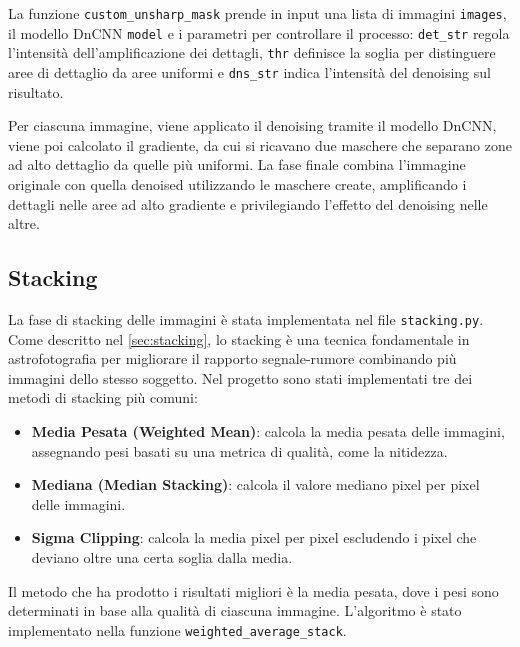La funzione \texttt{custom\_unsharp\_mask} prende in input una lista di immagini \texttt{images}, il modello DnCNN \texttt{model} e i parametri per controllare il processo: \texttt{det\_str} regola l'intensità dell'amplificazione dei dettagli, \texttt{thr} definisce la soglia per distinguere aree di dettaglio da aree uniformi e \texttt{dns\_str} indica l'intensità del denoising sul risultato. 

Per ciascuna immagine, viene applicato il denoising tramite il modello DnCNN, viene poi calcolato il gradiente, da cui si ricavano due maschere che separano zone ad alto dettaglio da quelle più uniformi. La fase finale combina l'immagine originale con quella denoised utilizzando le maschere create, amplificando i dettagli nelle aree ad alto gradiente e privilegiando l'effetto del denoising nelle altre.

\subsection{Stacking} \label{subsec:stacking_impl}

La fase di stacking delle immagini è stata implementata nel file \texttt{stacking.py}. Come descritto nel \cref{sec:stacking}, lo stacking è una tecnica fondamentale in astrofotografia per migliorare il rapporto segnale-rumore combinando più immagini dello stesso soggetto. Nel progetto sono stati implementati tre dei metodi di stacking più comuni:

\begin{itemize}
    \item \textbf{Media Pesata (Weighted Mean)}: calcola la media pesata delle immagini, assegnando pesi basati su una metrica di qualità, come la nitidezza.
    \item \textbf{Mediana (Median Stacking)}: calcola il valore mediano pixel per pixel delle immagini.
    \item \textbf{Sigma Clipping}: calcola la media pixel per pixel escludendo i pixel che deviano oltre una certa soglia dalla media.
\end{itemize}

Il metodo che ha prodotto i risultati migliori è la media pesata, dove i pesi sono determinati in base alla qualità di ciascuna immagine. L'algoritmo è stato implementato nella funzione \texttt{weighted\_average\_stack}.

